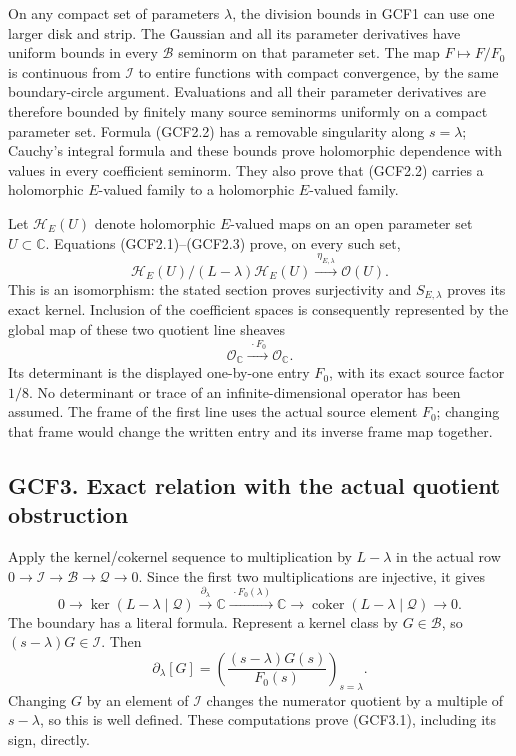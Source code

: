 On any compact set of parameters \(\lambda\), the division bounds in
GCF1 can use one larger disk and strip. The Gaussian and all its
parameter derivatives have uniform bounds in every \(\mathcal B\)
seminorm on that parameter set. The map \(F\mapsto F/F_0\) is continuous
from \(\mathcal I\) to entire functions with compact convergence, by the
same boundary-circle argument. Evaluations and all their parameter
derivatives are therefore bounded by finitely many source seminorms
uniformly on a compact parameter set. Formula (GCF2.2) has a removable
singularity along \(s=\lambda\); Cauchy's integral formula and these
bounds prove holomorphic dependence with values in every coefficient
seminorm. They also prove that (GCF2.2) carries a holomorphic
\(E\)-valued family to a holomorphic \(E\)-valued family.

Let \(\mathcal H_E(U)\) denote holomorphic \(E\)-valued maps on an open
parameter set \(U\subset\mathbb C\). Equations (GCF2.1)--(GCF2.3) prove,
on every such set, \[
\mathcal H_E(U)/(L-\lambda)\mathcal H_E(U)
\xrightarrow{\ \eta_{E,\lambda}\ }\mathcal O(U).
\tag{GCF2.4}
\] This is an isomorphism: the stated section proves surjectivity and
\(S_{E,\lambda}\) proves its exact kernel. Inclusion of the coefficient
spaces is consequently represented by the global map of these two
quotient line sheaves \[
\mathcal O_{\mathbb C}\xrightarrow{\ \cdot F_0\ }\mathcal O_{\mathbb C}.
\tag{GCF2.5}
\] Its determinant is the displayed one-by-one entry \(F_0\), with its
exact source factor \(1/8\). No determinant or trace of an
infinite-dimensional operator has been assumed. The frame of the first
line uses the actual source element \(F_0\); changing that frame would
change the written entry and its inverse frame map together.

\subsection{GCF3. Exact relation with the actual quotient
obstruction}\label{gcf3.-exact-relation-with-the-actual-quotient-obstruction}

Apply the kernel/cokernel sequence to multiplication by \(L-\lambda\) in
the actual row \(0\to\mathcal I\to\mathcal B\to\mathcal Q\to0\). Since
the first two multiplications are injective, it gives \[
0\to\ker(L-\lambda\mid\mathcal Q)
\xrightarrow{\partial_\lambda}\mathbb C
\xrightarrow{\ \cdot F_0(\lambda)\ }\mathbb C
\to\operatorname{coker}(L-\lambda\mid\mathcal Q)\to0.
\tag{GCF3.1}
\] The boundary has a literal formula. Represent a kernel class by
\(G\in\mathcal B\), so \((s-\lambda)G\in\mathcal I\). Then \[
\partial_\lambda[G]
=\left(\frac{(s-\lambda)G(s)}{F_0(s)}\right)_{s=\lambda}.
\tag{GCF3.2}
\] Changing \(G\) by an element of \(\mathcal I\) changes the numerator
quotient by a multiple of \(s-\lambda\), so this is well defined. These
computations prove (GCF3.1), including its sign, directly.

